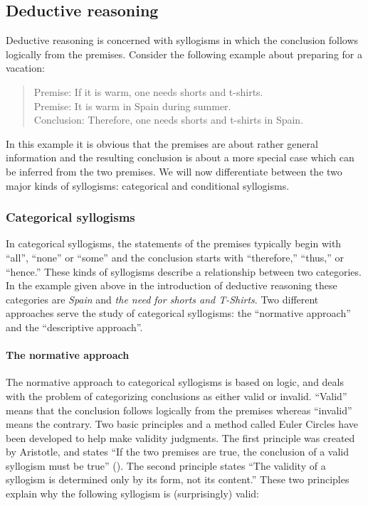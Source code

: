 \documentclass[
]{krantz}
\newcounter{none} %
\begin{document}
\subsection{Deductive reasoning}\label{deductive-reasoning}

Deductive reasoning is concerned with syllogisms in which the conclusion follows logically from the premises. Consider the following example about preparing for a vacation:

\begin{quote}
Premise: If it is warm, one needs shorts and t-shirts.\\
Premise: It is warm in Spain during summer.\\
Conclusion: Therefore, one needs shorts and t-shirts in Spain.
\end{quote}

In this example it is obvious that the premises are about rather general information and the resulting conclusion is about a more special case which can be inferred from the two premises. We will now differentiate between the two major kinds of syllogisms: categorical and conditional syllogisms.

\subsubsection*{Categorical syllogisms}\label{categorical-syllogisms}


In categorical syllogisms, the statements of the premises typically begin with ``all'', ``none'' or ``some'' and the conclusion starts with ``therefore,'' ``thus,'' or ``hence.'' These kinds of syllogisms describe a relationship between two categories. In the example given above in the introduction of deductive reasoning these categories are \emph{Spain} and \emph{the need for shorts and T-Shirts}. Two different approaches serve the study of categorical syllogisms: the ``normative approach'' and the ``descriptive approach''.

\paragraph*{The normative approach}\label{the-normative-approach}

The normative approach to categorical syllogisms is based on logic, and deals with the problem of categorizing conclusions as either valid or invalid. ``Valid'' means that the conclusion follows logically from the premises whereas ``invalid'' means the contrary. Two basic principles and a method called Euler Circles have been developed to help make validity judgments. The first principle was created by Aristotle, and states ``If the two premises are true, the conclusion of a valid syllogism must be true'' (). The second principle states ``The validity of a syllogism is determined only by its form, not its content.'' These two principles explain why the following syllogism is (surprisingly) valid:
\end{document}
